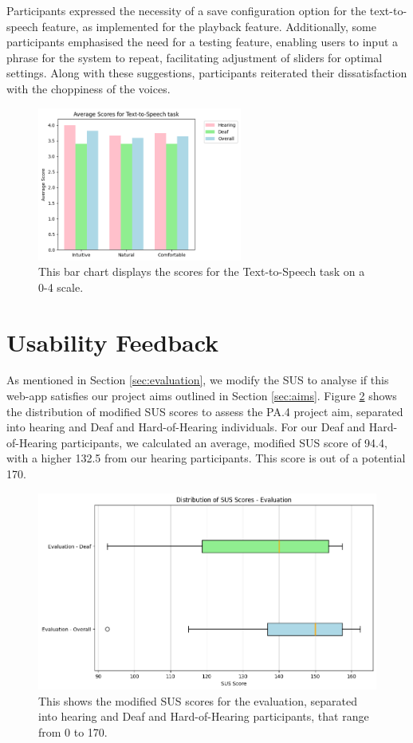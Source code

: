 \documentclass{l4proj}
\begin{document}
Participants expressed the necessity of a save configuration option for the text-to-speech feature, as implemented for the playback feature. Additionally, some participants emphasised the need for a testing feature, enabling users to input a phrase for the system to repeat, facilitating adjustment of sliders for optimal settings. Along with these suggestions, participants reiterated their dissatisfaction with the choppiness of the voices. 

\begin{figure}
    \centering
    \includegraphics[width=0.6\textwidth]{dissertation/images/TTS.png}
    \caption{This bar chart displays the scores for the Text-to-Speech task on a 0-4 scale.}
    \label{fig:TTS-chart}
\end{figure}

\section{Usability Feedback}

As mentioned in Section \ref{sec:evaluation}, we modify the SUS to analyse if this web-app satisfies our project aims outlined in Section \ref{sec:aims}. Figure \ref{fig:eval} shows the distribution of modified SUS scores to assess the PA.4 project aim, separated into hearing and Deaf and Hard-of-Hearing individuals. For our Deaf and Hard-of-Hearing participants, we calculated an average, modified SUS score of 94.4, with a higher 132.5 from our hearing participants. This score is out of a potential 170.

\begin{figure}
    \centering
    \includegraphics[width=0.75\linewidth]{dissertation/images/EvaluationBoxPlots.png}    
    \caption{This shows the modified SUS scores for the evaluation, separated into hearing and Deaf and Hard-of-Hearing participants, that range from 0 to 170.}
    \label{fig:eval} 
\end{figure}
\end{document}
